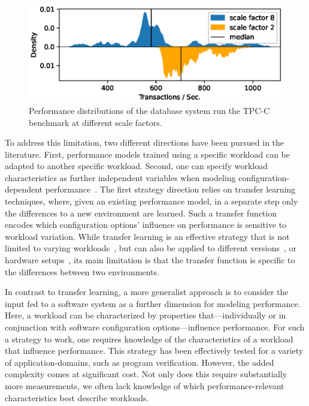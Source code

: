 \begin{figure}
	\centering
	\includegraphics[width=0.8\linewidth]{images/h2_motivation.eps}
	\caption{Performance distributions of the database system \htwo run the \textsf{TPC-C} benchmark at different scale factors.}
	\label{fig:h2_intro}
\end{figure}

To address this limitation, two different directions have been pursued in the literature. First, performance models trained using a specific workload can be adapted to another specific workload. Second,  one can specify workload characteristics as further independent variables when modeling configuration-dependent performance~\cite{koc_satune_2021}.
The first strategy direction relies on transfer learning techniques, where, given an existing performance model, in a separate step only the differences to a new environment are learned. Such a transfer function encodes which configuration options’ influence on performance is sensitive to workload variation. While transfer learning is an effective strategy that is not limited to varying workloads~\cite{jamshidi_learning_2018}, but can also be applied to different versions~\cite{jamishidi_transfer_2017,jamshidi_transfer_gp_2017,martin_transfer_2021}, or hardware setups~\cite{ding_bayesian_2020}, its main limitation is that the transfer function is specific to the differences between two environments.



In contrast to transfer learning, a more generalist approach is to consider the input fed to a software system as a further dimension for modeling performance. Here, a workload can be characterized by properties that---individually or in conjunction with software configuration options---influence performance. For such a strategy to work, one requires knowledge of the characteristics of a workload that influence performance. This strategy has been effectively tested for a  variety of application-domains, such as program verification. However, the added complexity comes at significant cost. 
Not only does this require substantially more measurements, we often lack knowledge of which performance-relevant characteristics best describe workloads.


